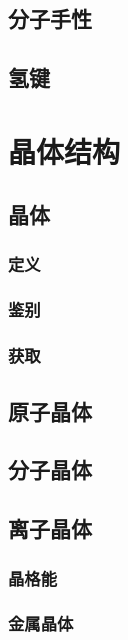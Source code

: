 \documentclass[a4paper]{article}
\begin{document}
		
	\subsection{分子手性}
	
	
	\subsection{氢键}
		
	
	\clearpage
	\section{晶体结构}
	
	
	\subsection{晶体}
	
	\subsubsection{定义}
	
	\subsubsection{鉴别}
	
	\subsubsection{获取}
	
	
	\subsection{原子晶体}
	
	\subsection{分子晶体}
	
	\subsection{离子晶体}
	
	\subsubsection{晶格能}
	
	\subsubsection{金属晶体}
	
\end{document}
